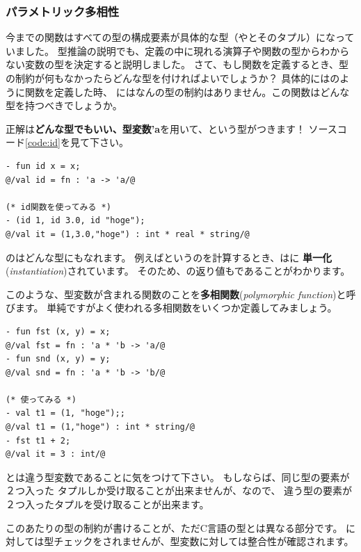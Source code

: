 \documentclass[11pt,a4paper]{jarticle}
\begin{document}
\subsubsection{パラメトリック多相性}

今までの関数はすべての型の構成要素が具体的な型（やとそのタプル）になっていました。
型推論の説明でも、定義の中に現れる演算子や関数の型からわからない変数の型を決定すると説明しました。
さて、もし関数を定義するとき、型の制約が何もなかったらどんな型を付ければよいでしょうか？
具体的にはのように関数を定義した時、
にはなんの型の制約はありません。この関数はどんな型を持つべきでしょうか。

正解は{\bfseries どんな型でもいい、型変数'a}を用いて、という型がつきます！
ソースコード\ref{code:id}を見て下さい。

\begin{lstlisting}[caption=多相関数,label=code:id]
- fun id x = x;
@/val id = fn : 'a -> 'a/@

(* id関数を使ってみる *)
- (id 1, id 3.0, id "hoge");
@/val it = (1,3.0,"hoge") : int * real * string/@
\end{lstlisting}

のはどんな型にもなれます。
例えばというのを計算するとき、はに
{\bfseries 単一化}({\itshape instantiation})されています。
そのため、の返り値もであることがわかります。

このような、型変数が含まれる関数のことを{\bfseries 多相関数}({\itshape polymorphic function})と呼びます。
単純ですがよく使われる多相関数をいくつか定義してみましょう。

\begin{lstlisting}[caption=多相関数たち,label=code:poly]
- fun fst (x, y) = x;
@/val fst = fn : 'a * 'b -> 'a/@
- fun snd (x, y) = y;
@/val snd = fn : 'a * 'b -> 'b/@

(* 使ってみる *)
- val t1 = (1, "hoge");;
@/val t1 = (1,"hoge") : int * string/@
- fst t1 + 2;
@/val it = 3 : int/@
\end{lstlisting}

とは違う型変数であることに気をつけて下さい。
もしならば、同じ型の要素が２つ入った
タプルしか受け取ることが出来ませんが、なので、
違う型の要素が２つ入ったタプルを受け取ることが出来ます。

このあたりの型の制約が書けることが、ただC言語の型とは異なる部分です。
に対しては型チェックをされませんが、型変数に対しては整合性が確認されます。
\end{document}
